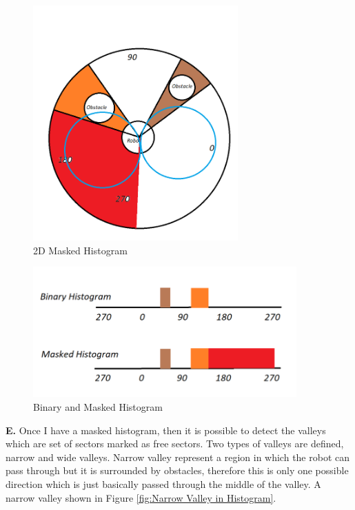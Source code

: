 \begin{figure}[H]
  \centering
  \includegraphics[width= 0.7\textwidth]{Figures/maskedcircle.PNG}
  \caption[2D Masked Histogram]{2D Masked Histogram}
   \label{fig:2D Masked Histogram} 
\end{figure}
\begin{figure}[H]
  \centering
  \includegraphics[width= 0.9\textwidth]{Figures/Binaryandmaskhis.PNG}
  \caption[Binary and Masked Histogram]{Binary and Masked Histogram}
   \label{fig:Binary and Masked Histogram} 
\end{figure}

\noindent \textbf{ E. } Once I have a masked histogram, then it is possible to detect the valleys which are set of sectors marked as free sectors. Two types of valleys are defined, narrow  and wide valleys. Narrow valley represent a region in which the robot can pass through but it is surrounded by obstacles, therefore this is only one possible direction which is just basically passed through the middle of the valley. A narrow valley shown in Figure \ref{fig:Narrow Valley in Histogram}. 

